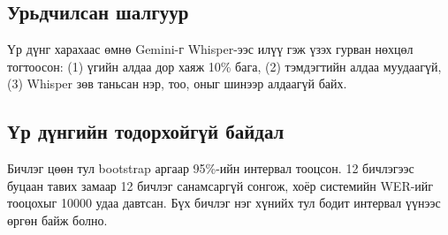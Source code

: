 \subsection{Урьдчилсан шалгуур}
\label{sec:stt-criteria}

Үр дүнг харахаас өмнө Gemini-г Whisper-ээс илүү гэж үзэх гурван нөхцөл тогтоосон: (1) үгийн алдаа дор хаяж 10\% бага, (2) тэмдэгтийн алдаа муудаагүй, (3) Whisper зөв таньсан нэр, тоо, оныг шинээр алдаагүй байх.

\subsection{Үр дүнгийн тодорхойгүй байдал}
\label{sec:stt-ci}

Бичлэг цөөн тул bootstrap аргаар 95\%-ийн интервал тооцсон. 12 бичлэгээс буцаан тавих замаар 12 бичлэг санамсаргүй сонгож, хоёр системийн WER-ийг тооцохыг 10000 удаа давтсан. Бүх бичлэг нэг хүнийх тул бодит интервал үүнээс өргөн байж болно.
\fi
\fi
